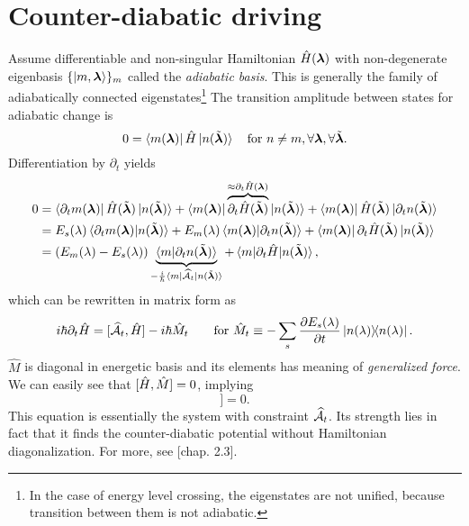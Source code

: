 \section{Counter-diabatic driving}

Assume differentiable and non-singular Hamiltonian $\HH(\llambda)$ with non-degenerate eigenbasis $\{\ket{m,\llambda}\}_m$ called the \emph{adiabatic basis}. This is generally the family of adiabatically connected eigenstates\footnote{In the case of energy level crossing, the eigenstates are not unified, because transition between them is not adiabatic.} The transition amplitude between states for adiabatic change is
\begin{equation}
    0=\bra{m(\llambda)}\HH\ket{n(\tilde\llambda)} \quad \text{for }n\neq m, \forall \llambda,\forall \tilde \llambda.
\end{equation}
Differentiation by $\partial_t$ yields
\begin{equation}
    \begin{split}
        0&=\bra{\partial_t m(\llambda)}\HH(\tilde \llambda)\ket{n(\tilde\llambda)}+ \bra{m(\llambda)}\overbrace{\partial_t\HH(\tilde \llambda)}^{\approx \partial_t\HH(\llambda)}\ket{n(\tilde\llambda)}+ \bra{m(\llambda)}\HH(\tilde \llambda)\ket{\partial_t n(\tilde \llambda)}\\
        &=E_s(\lambda)\braket{\partial_t m(\llambda)|n(\tilde \llambda)} + E_m(\lambda)\braket{m(\llambda)|\partial_t n(\tilde \llambda)}+ \bra{m(\llambda)}\partial_t \HH(\tilde\llambda)\ket{n(\tilde \llambda)}\\
        &= (E_m(\lambda)-E_s(\lambda))\underbrace{\braket{m|\partial_t n(\tilde \llambda)}}_{-\frac{i}{\hbar}\bra{m}\AA_t\ket{n(\tilde \llambda)}} + \braket{m|\partial_t\HH|n(\tilde \llambda)},
    \end{split}
\end{equation}
which can be rewritten in matrix form as
\begin{equation}
    i\hbar\partial_t\HH=[\AA_t,\HH]-i\hbar \hat{M}_t\qquad \text{for } \hat{M}_t\equiv -\sum_s\pder{E_s(\lambda)}{t}\ket{n(\lambda)}\!\!\bra{n(\lambda)}.
\end{equation}
$\hat{M}$ is diagonal in energetic basis and its elements has meaning of \emph{generalized force}. We can easily see that $[\HH,\hat{M}]=0$, implying
\begin{equation}
    [\HH,i\hbar\partial_t\HH-[\AA_t,\HH]]=0.
    \label{eq:komutation}
\end{equation}
This equation is essentially the system with constraint $\AA_t$. Its strength lies in fact that it finds the counter-diabatic potential without Hamiltonian diagonalization. For more, see \cite{kolodrubez}[chap. 2.3].











